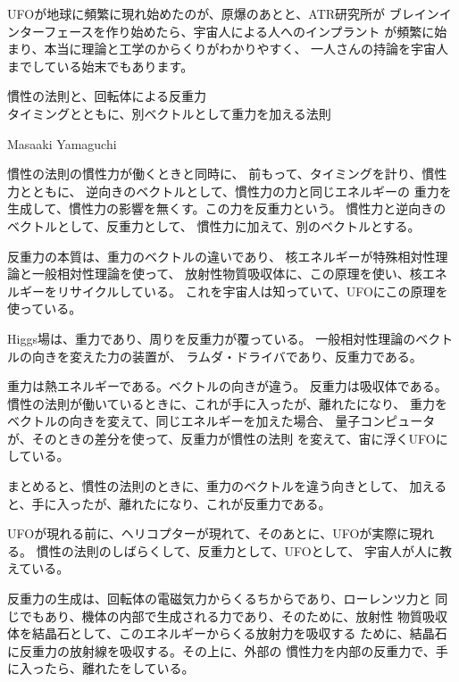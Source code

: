 \documentclass{jsarticle}
\begin{document}
{   UFOが地球に頻繁に現れ始めたのが、原爆のあとと、ATR研究所が
   ブレインインターフェースを作り始めたら、宇宙人による人へのインプラント
   が頻繁に始まり、本当に理論と工学のからくりがわかりやすく、
   一人さんの持論を宇宙人までしている始末でもあります。

\newpage
\begin{center}
\large	慣性の法則と、回転体による反重力 \\
タイミングとともに、別ベクトルとして重力を加える法則
\end{center}
\begin{center}
	Masaaki Yamaguchi
\end{center}

   慣性の法則の慣性力が働くときと同時に、
   前もって、タイミングを計り、慣性力とともに、
   逆向きのベクトルとして、慣性力の力と同じエネルギーの
   重力を生成して、慣性力の影響を無くす。この力を反重力という。
   慣性力と逆向きのベクトルとして、反重力として、
   慣性力に加えて、別のベクトルとする。

   反重力の本質は、重力のベクトルの違いであり、
   核エネルギーが特殊相対性理論と一般相対性理論を使って、
   放射性物質吸収体に、この原理を使い、核エネルギーをリサイクルしている。
   これを宇宙人は知っていて、UFOにこの原理を使っている。

   Higgs場は、重力であり、周りを反重力が覆っている。
   一般相対性理論のベクトルの向きを変えた力の装置が、
   ラムダ・ドライバであり、反重力である。

   重力は熱エネルギーである。ベクトルの向きが違う。
   反重力は吸収体である。
   慣性の法則が働いているときに、これが手に入ったが、離れたになり、
   重力をベクトルの向きを変えて、同じエネルギーを加えた場合、
   量子コンピュータが、そのときの差分を使って、反重力が慣性の法則
   を変えて、宙に浮くUFOにしている。 

   まとめると、慣性の法則のときに、重力のベクトルを違う向きとして、
   加えると、手に入ったが、離れたになり、これが反重力である。 

   UFOが現れる前に、ヘリコプターが現れて、そのあとに、UFOが実際に現れる。
   慣性の法則のしばらくして、反重力として、UFOとして、
   宇宙人が人に教えている。

   反重力の生成は、回転体の電磁気力からくるちからであり、ローレンツ力と
   同じでもあり、機体の内部で生成される力であり、そのために、放射性
   物質吸収体を結晶石として、このエネルギーからくる放射力を吸収する
   ために、結晶石に反重力の放射線を吸収する。その上に、外部の
   慣性力を内部の反重力で、手に入ったら、離れたをしている。


}
\end{document}
